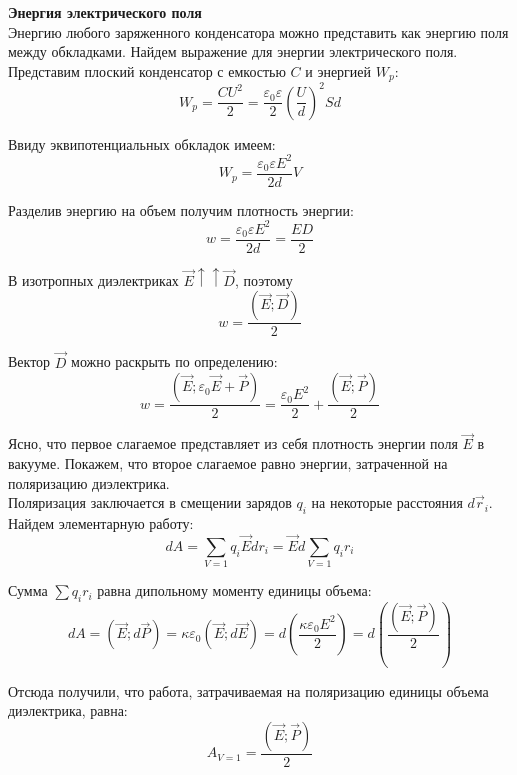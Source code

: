 \documentclass{article}
\begin{document}
	
	\textbf{Энергия электрического поля}\\

	Энергию любого заряженного конденсатора можно представить как энергию поля между обкладками. Найдем выражение для энергии электрического поля. Представим плоский конденсатор с емкостью $C$ и энергией $W_p$:
	\begin{equation}
		W_p = \frac{CU^2}{2} = \frac{\varepsilon_0\varepsilon}{2}(\frac{U}{d})^2 Sd
	\end{equation}

	Ввиду эквипотенциальных обкладок имеем:
	\begin{equation}
		W_p = \frac{\varepsilon_0\varepsilon E^2}{2d}V
	\end{equation}

	Разделив энергию на объем получим плотность энергии:
	\begin{equation}
		w = \frac{\varepsilon_0\varepsilon E^2}{2d} = \frac{ED}{2}
	\end{equation}

	В изотропных диэлектриках $\vec E \uparrow\uparrow \vec D$, поэтому
	\begin{equation}
		w = \frac{(\vec E;\vec D)}{2}
	\end{equation}

	Вектор $\vec D$ можно раскрыть по определению:
	\begin{equation}
		w = \frac{(\vec E;\varepsilon_0\vec E + \vec P)}{2} = \frac{\varepsilon_0 E^2}{2} + \frac{(\vec E;\vec P)}{2}
	\end{equation}

	Ясно, что первое слагаемое представляет из себя плотность энергии поля $\vec E$ в вакууме. Покажем, что второе слагаемое равно энергии, затраченной на поляризацию диэлектрика. \\

	Поляризация заключается в смещении зарядов $q_i$ на некоторые расстояния $d\vec r_i$. Найдем элементарную работу:
	\begin{equation}
		dA = \sum_{V=1} q_i\vec E dr_i = \vec E d\sum_{V=1} q_i r_i 
	\end{equation}

	Сумма $\sum q_ir_i$ равна дипольному моменту единицы объема:
	\begin{equation}
		dA = (\vec E;d\vec P) = \kappa\varepsilon_0(\vec E;d\vec E) = d(\frac{\kappa\varepsilon_0E^2}{2}) = d(\frac{(\vec E;\vec P)}{2})
	\end{equation}

	Отсюда получили, что работа, затрачиваемая на поляризацию единицы объема диэлектрика, равна:
	\begin{equation}
		A_{V=1} = \frac{(\vec E;\vec P)}{2}
	\end{equation}
\end{document}
